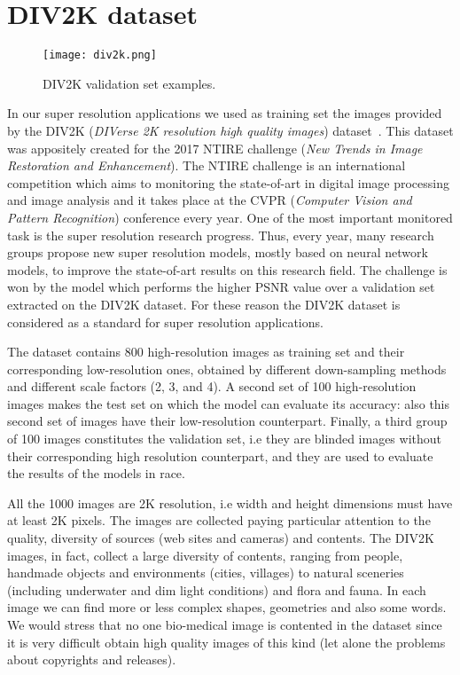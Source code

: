\documentclass{standalone}
\begin{document}
\section[DIV2K dataset]{DIV2K dataset}\label{SR:div2k}

\begin{center}
\begin{figure}[htbp]
\centering
\texttt{[image: div2k.png]}
\caption{DIV2K validation set examples.
}
\label{fig:div2k}
\end{figure}
\end{center}

In our super resolution applications we used as training set the images provided by the DIV2K (\emph{DIVerse 2K resolution high quality images}) dataset~\cite{Agustsson_2017_CVPR_Workshops}.
This dataset was appositely created for the 2017 NTIRE challenge (\emph{New Trends in Image Restoration and Enhancement}).
The NTIRE challenge is an international competition which aims to monitoring the state-of-art in digital image processing and image analysis and it takes place at the CVPR (\emph{Computer Vision and Pattern Recognition}) conference every year.
One of the most important monitored task is the super resolution research progress.
Thus, every year, many research groups propose new super resolution models, mostly based on neural network models, to improve the state-of-art results on this research field.
The challenge is won by the model which performs the higher PSNR value over a validation set extracted on the DIV2K dataset.
For these reason the DIV2K dataset is considered as a standard for super resolution applications.

The dataset contains 800 high-resolution images as training set and their corresponding low-resolution ones, obtained by different down-sampling methods and different scale factors (2, 3, and 4).
A second set of 100 high-resolution images makes the test set on which the model can evaluate its accuracy: also this second set of images have their low-resolution counterpart.
Finally, a third group of 100 images constitutes the validation set, i.e they are blinded images without their corresponding high resolution counterpart, and they are used to evaluate the results of the models in race.

All the 1000 images are 2K resolution, i.e width and height dimensions must have at least 2K pixels.
The images are collected paying particular attention to the quality, diversity of sources (web sites and cameras) and contents.
The DIV2K images, in fact, collect a large diversity of contents, ranging from people, handmade objects and environments (cities, villages) to natural sceneries (including underwater and dim light conditions) and flora and fauna.
In each image we can find more or less complex shapes, geometries and also some words.
We would stress that no one bio-medical image is contented in the dataset since it is very difficult obtain high quality images of this kind (let alone the problems about copyrights and releases).
\end{document}
